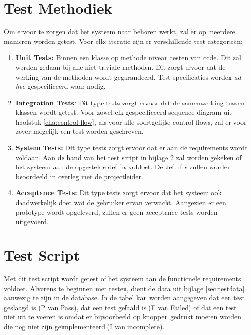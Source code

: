 \documentclass[a4paper,titlepage]{report}
\begin{document}
  \section{Test Methodiek}
    Om ervoor te zorgen dat het systeem naar behoren werkt, zal er op meerdere
    manieren worden getest. Voor elke iteratie zijn er verschillende test 
    categorie\"en:
    \begin{enumerate}
      \item \textbf{Unit Tests:} Binnen een klasse op methode niveau testen 
        van code. Dit zal worden gedaan bij alle niet-triviale methoden. Dit
        zorgt ervoor dat de werking van de methoden wordt gegarandeerd. Test
        specificaties worden \emph{ad-hoc} gespecificeerd waar nodig.
      \item \textbf{Integration Tests:} Dit type tests zorgt ervoor dat de samenwerking
        tussen klassen wordt getest. Voor zowel elk gespecificeerd sequence diagram
        uit hoofstuk \ref{cha:control-flow}, als voor alle soortgelijke control
        flows, zal er voor zover mogelijk een test worden geschreven. 
      \item \textbf{System Tests:} Dit type tests zorgt ervoor dat er aan de
        requirements wordt voldaan. Aan de hand van het test script in bijlage
        \ref{sec:testscript} zal worden gekeken of het systeem aan de opgestelde
        \glspl{def:fr} voldoet. De \glspl{def:nfr}
        zullen worden beoordeeld in overleg met de projectleider.
      \item \textbf{Acceptance Tests:} Dit type tests zorgt ervoor dat het
        systeem ook daadwerkelijk doet wat de gebruiker ervan verwacht.
        Aangezien er een prototype wordt opgeleverd, zullen er geen acceptance
        tests worden uitgevoerd.
    \end{enumerate}


  \pagebreak
  \section{Test Script}
    \label{sec:testscript}
    Met dit test script wordt getest of het systeem aan de functionele
    requirements voldoet. Alvorens te beginnen met testen, dient de data uit
    bijlage \ref{sec:testdata} aanwezig te zijn in de database. In de tabel kan
    worden aangegeven dat een test geslaagd is (P van Pass), dat een test gefaald
    is (F van Failed) of dat een test niet uit te voeren is omdat er
    bijvoorbeeld op knoppen gedrukt moeten worden die nog niet zijn
    ge\"implementeerd (I van incomplete).
\end{document}
